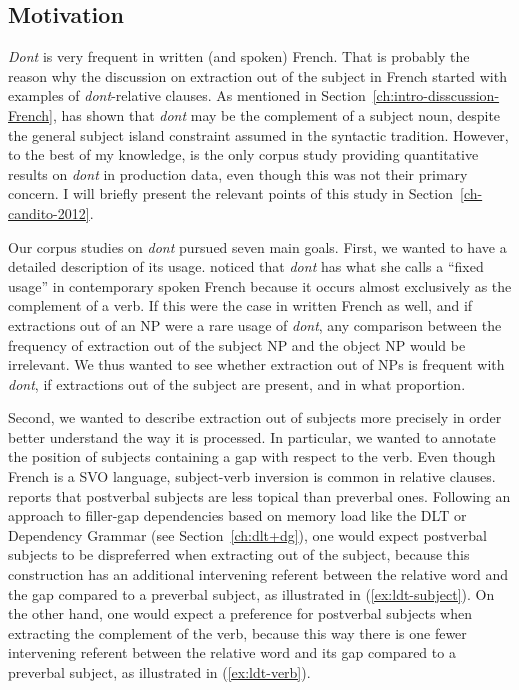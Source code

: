 \subsection{Motivation}

\emph{Dont} is very frequent in written (and spoken) French. That is probably the reason why the discussion on extraction out of the subject in French started with examples of \emph{dont}-relative clauses.
As mentioned in Section~\ref{ch:intro-disscussion-French}, \citet{Godard.1988} has shown that \emph{dont} may be the complement of a subject noun, despite the general subject island constraint assumed in the syntactic tradition. However, to the best of my knowledge, \citet{Candito.2012.ldd} is the only corpus study providing quantitative results on \emph{dont} in production data, even though this was not their primary concern. I will briefly present the relevant points of this study in Section~\ref{ch-candito-2012}. 

Our corpus studies on \textit{dont} pursued seven main goals. First, we wanted to have a detailed description of its usage. \citet{Blanche-Benveniste.1990} noticed that \emph{dont} has what she calls a ``fixed usage'' in contemporary spoken French because it occurs almost exclusively as the complement of a verb. If this were the case in written French as well, and if extractions out of an NP were a rare usage of \emph{dont}, any comparison between the frequency of extraction out of the subject NP and the object NP would be irrelevant. We thus wanted to see whether extraction out of NPs is frequent with \emph{dont}, if extractions out of the subject are present, and in what proportion. 

Second, we wanted to describe extraction out of subjects more precisely in order better understand the way it is processed. In particular, we wanted to annotate the position of subjects containing a gap with respect to the verb. Even though French is a SVO language, subject-verb inversion is common in relative clauses. %
\citet[263]{Lahousse.2011} reports that postverbal subjects are less topical than preverbal ones. Following an approach to filler-gap dependencies based on memory load like the DLT or Dependency Grammar (see Section~\ref{ch:dlt+dg}), one would expect postverbal subjects to be dispreferred when extracting out of the subject, because this construction has an additional intervening referent between the relative word and the gap compared to a preverbal subject, as illustrated in (\ref{ex:ldt-subject}). On the other hand, one would expect a preference for postverbal subjects when extracting the complement of the verb, because this way there is one fewer intervening referent between the relative word and its gap compared to a preverbal subject, as illustrated in (\ref{ex:ldt-verb}).

